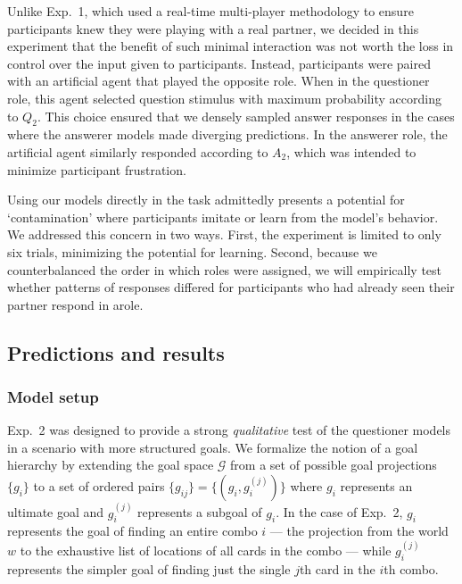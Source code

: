 \documentclass[11pt, floatsintext]{apa6}
\begin{document}
Unlike Exp.~1, which used a real-time multi-player methodology to ensure participants knew they were playing with a real partner, we decided in this experiment that the benefit of such minimal interaction was not worth the loss in control over the input given to participants.
Instead, participants were paired with an artificial agent that played the opposite role.
When in the questioner role, this agent selected question stimulus with maximum probability according to $Q_2$. 
This choice ensured that we densely sampled answer responses in the cases where the answerer models made diverging predictions.
In the answerer role, the artificial agent similarly responded according to $A_2$, which was intended to minimize participant frustration.

Using our models directly in the task admittedly presents a potential for `contamination' where participants imitate or learn from the model's behavior. 
We addressed this concern in two ways. 
First, the experiment is limited to only six trials, minimizing the potential for learning.
Second, because we counterbalanced the order in which roles were assigned, we will empirically test whether patterns of responses differed for participants who had already seen their partner respond in arole.

\subsection{Predictions and results}

\subsubsection{Model setup}

Exp.~2 was designed to provide a strong \emph{qualitative} test of the questioner models in a scenario with more structured goals.
We formalize the notion of a goal hierarchy by extending the goal space $\mathcal{G}$ from a set of possible goal projections $\{g_i\}$ to a set of ordered pairs $\{g_{ij}\} = \{(g_i, g_i^{(j)})\}$ where $g_i$ represents an ultimate goal and $g_i^{(j)}$ represents a subgoal of $g_i$. 
In the case of Exp.~2, $g_i$ represents the goal of finding an entire combo $i$ --- the projection from the world $w$ to the exhaustive list of locations of all cards in the combo --- while $g_i^{(j)}$ represents the simpler goal of finding just the single $j$th card in the $i$th combo. 
\end{document}

